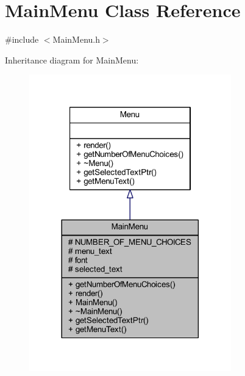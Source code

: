 \hypertarget{class_main_menu}{}\section{Main\+Menu Class Reference}
\label{class_main_menu}


{\ttfamily \#include $<$Main\+Menu.\+h$>$}



Inheritance diagram for Main\+Menu\+:\nopagebreak
\begin{figure}[H]
\begin{center}
\leavevmode
\includegraphics[width=248pt]{class_main_menu__inherit__graph}
\end{center}
\end{figure}


